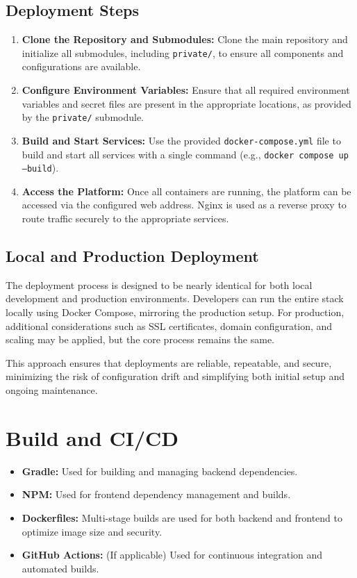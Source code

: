 \subsection{Deployment Steps} \label{subsec:deployment_steps}
\begin{enumerate}
    \item \textbf{Clone the Repository and Submodules:} Clone the main repository and initialize all submodules, including \texttt{private/}, to ensure all components and configurations are available.
    \item \textbf{Configure Environment Variables:} Ensure that all required environment variables and secret files are present in the appropriate locations, as provided by the \texttt{private/} submodule.
    \item \textbf{Build and Start Services:} Use the provided \texttt{docker-compose.yml} file to build and start all services with a single command (e.g., \texttt{docker compose up --build}).
    \item \textbf{Access the Platform:} Once all containers are running, the platform can be accessed via the configured web address. Nginx is used as a reverse proxy to route traffic securely to the appropriate services.
\end{enumerate}

\subsection{Local and Production Deployment} \label{subsec:local_prod_deployment}
The deployment process is designed to be nearly identical for both local development and production environments. Developers can run the entire stack locally using Docker Compose, mirroring the production setup. For production, additional considerations such as SSL certificates, domain configuration, and scaling may be applied, but the core process remains the same.

This approach ensures that deployments are reliable, repeatable, and secure, minimizing the risk of configuration drift and simplifying both initial setup and ongoing maintenance.

\section{Build and CI/CD} \label{sec:build_cicd}

\begin{itemize}
    \item \textbf{Gradle:} Used for building and managing backend dependencies.
    \item \textbf{NPM:} Used for frontend dependency management and builds.
    \item \textbf{Dockerfiles:} Multi-stage builds are used for both backend and frontend to optimize image size and security.
    \item \textbf{GitHub Actions:} (If applicable) Used for continuous integration and automated builds.
\end{itemize}


